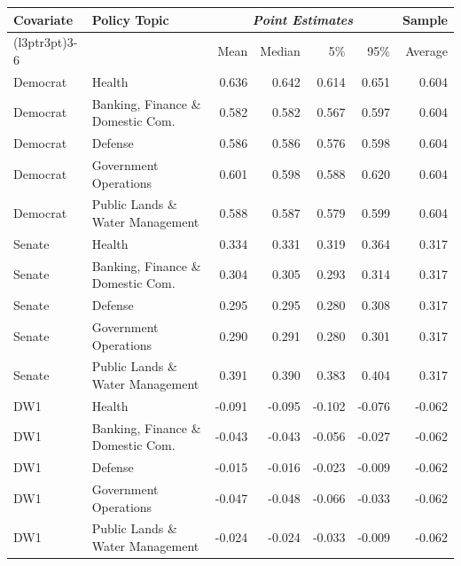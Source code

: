 

\begin{tabular}{llrrrrr}
\toprule
\multirow{2}{*}{Covariate} & \multirow{2}{*}{Policy Topic} & \multicolumn{4}{c}{\textit{Point Estimates}} & Sample \\
\cmidrule(l{3pt}r{3pt}){3-6}
& & Mean & Median & 5\% & 95\% & Average\\
\midrule
Democrat & Health & 0.636 & 0.642 & 0.614 & 0.651 & 0.604\\
Democrat & Banking, Finance \& Domestic Com. & 0.582 & 0.582 & 0.567 & 0.597 & 0.604\\
Democrat & Defense & 0.586 & 0.586 & 0.576 & 0.598 & 0.604\\
Democrat & Government Operations & 0.601 & 0.598 & 0.588 & 0.620 & 0.604\\
Democrat & Public Lands \& Water Management & 0.588 & 0.587 & 0.579 & 0.599 & 0.604\\
\midrule
Senate & Health & 0.334 & 0.331 & 0.319 & 0.364 & 0.317\\
Senate & Banking, Finance \& Domestic Com. & 0.304 & 0.305 & 0.293 & 0.314 & 0.317\\
Senate & Defense & 0.295 & 0.295 & 0.280 & 0.308 & 0.317\\
Senate & Government Operations & 0.290 & 0.291 & 0.280 & 0.301 & 0.317\\
Senate & Public Lands \& Water Management & 0.391 & 0.390 & 0.383 & 0.404 & 0.317\\
\midrule
DW1 & Health & -0.091 & -0.095 & -0.102 & -0.076 & -0.062\\
DW1 & Banking, Finance \& Domestic Com. & -0.043 & -0.043 & -0.056 & -0.027 & -0.062\\
DW1 & Defense & -0.015 & -0.016 & -0.023 & -0.009 & -0.062\\
DW1 & Government Operations & -0.047 & -0.048 & -0.066 & -0.033 & -0.062\\
DW1 & Public Lands \& Water Management & -0.024 & -0.024 & -0.033 & -0.009 & -0.062\\
\bottomrule
\end{tabular}

